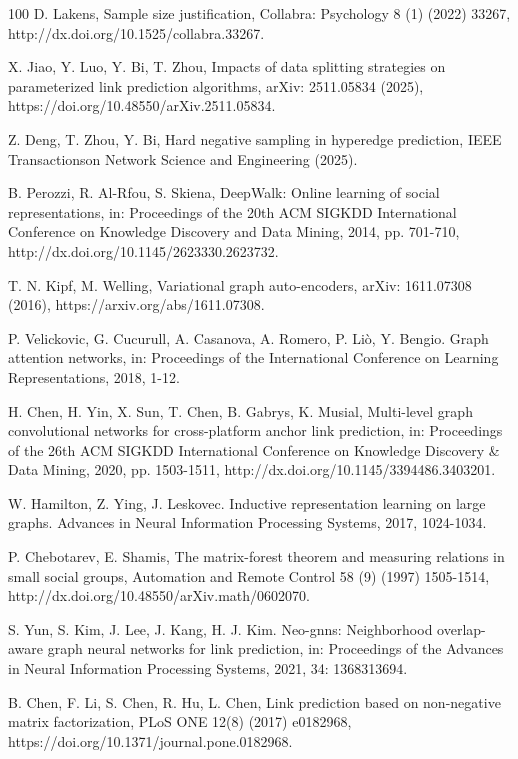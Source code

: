 \documentclass{article}
\begin{document}
\begin{thebibliography}{100}
	D. Lakens, Sample size justification, Collabra: Psychology 8 (1) (2022) 33267, http://dx.doi.org/10.1525/collabra.33267.
	
	X. Jiao, Y. Luo, Y. Bi, T. Zhou, Impacts of data splitting strategies on parameterized link prediction algorithms, arXiv: 2511.05834 (2025), 
	https://doi.org/10.48550/arXiv.2511.05834.
	
	Z. Deng, T. Zhou, Y. Bi, Hard negative sampling in hyperedge prediction, IEEE Transactionson Network Science and Engineering (2025).
	
	B. Perozzi, R. Al-Rfou, S. Skiena, DeepWalk: Online learning of social representations, in: Proceedings of the 20th ACM SIGKDD International Conference on Knowledge Discovery and Data Mining, 2014, pp. 701-710, http://dx.doi.org/10.1145/2623330.2623732.
	
	T. N. Kipf, M. Welling, Variational graph auto-encoders, arXiv: 1611.07308 (2016), https://arxiv.org/abs/1611.07308. 
	
	P. Velickovic, G. Cucurull, A. Casanova, A. Romero, P. Liò, Y. Bengio. Graph attention networks, in: Proceedings of the International Conference on Learning Representations, 2018, 1-12.
	
	H. Chen, H. Yin, X. Sun, T. Chen, B. Gabrys, K. Musial, Multi-level graph convolutional networks for cross-platform anchor link prediction, in: Proceedings of the 26th ACM SIGKDD International Conference on Knowledge Discovery \& Data Mining, 2020, pp. 1503-1511, http://dx.doi.org/10.1145/3394486.3403201.
	
	W. Hamilton, Z. Ying, J. Leskovec. Inductive representation learning on large graphs. Advances in Neural Information Processing Systems, 2017, 1024-1034. 
	
	P. Chebotarev, E. Shamis, The matrix-forest theorem and measuring relations in small social groups, Automation and Remote Control 58 (9) (1997) 1505-1514, http://dx.doi.org/10.48550/arXiv.math/0602070.
	
	S. Yun, S. Kim, J. Lee, J. Kang, H. J. Kim. Neo-gnns: Neighborhood overlap-aware graph neural networks for link prediction, in: Proceedings of the Advances in Neural Information Processing Systems, 2021, 34: 1368313694.
	
	B. Chen, F. Li, S. Chen, R. Hu, L. Chen, Link prediction based on non-negative matrix factorization, PLoS ONE 12(8) (2017) e0182968, https://doi.org/10.1371/journal.pone.0182968.
	

\end{thebibliography}
\end{document}
